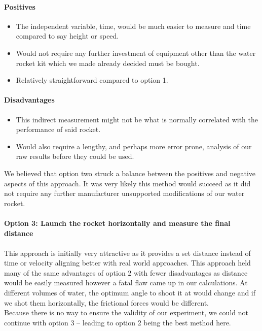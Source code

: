\documentclass[14pt]{article}
\begin{document}
\paragraph{Positives}
\begin{itemize}
    \item The independent variable, time, would be much easier to measure and time compared to say height or speed.
    \item Would not require any further investment of equipment other than the water rocket kit which we made already decided must be bought.
    \item Relatively straightforward compared to option 1.
\end{itemize}
\paragraph{Disadvantages}
\begin{itemize}
    \item This indirect measurement might not be what is normally correlated with the performance of said rocket.
    \item Would also require a lengthy, and perhaps more error prone, analysis of our raw results before they could be used.
\end{itemize}
We believed that option two struck a balance between the positives and negative aspects of this approach. It was very likely this method would succeed as it did not require any further manufacturer unsupported modifications of our water rocket.
\paragraph{Option 3: Launch the rocket horizontally and measure the final distance}
\paragraph{}
This approach is initially very attractive as it provides a set distance instead of time or velocity aligning better with real world approaches. This approach held many of the same advantages of option 2 with fewer disadvantages as distance would be easily measured however a fatal flaw came up in our calculations. At different volumes of water, the optimum angle to shoot it at would change and if we shot them horizontally, the frictional forces would be different. \\
Because there is no way to ensure the validity of our experiment, we could not continue with option 3 -- leading to option 2 being the best method here.
\end{document}
